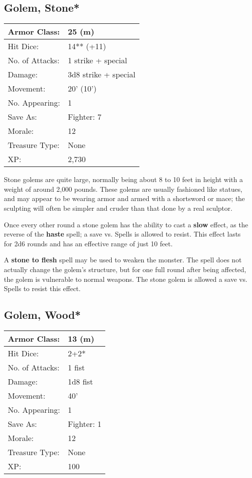 \documentclass[a4paper,twoside,openany,10pt]{book}
\begin{document}
\begin{multicols}{2}
\subsection*{Golem, Stone*}\label{golem-stone}

\begin{tabularx}{0.48\textwidth}{@{}lX@{}}
Armor Class: & 25 (m) \\\hline
Hit Dice: & 14** (+11)  \\\hline
No. of Attacks: & 1 strike + special \\\hline
Damage: & 3d8 strike + special \\\hline
Movement: & 20' (10') \\\hline
No. Appearing: & 1 \\\hline
Save As: & Fighter: 7 \\\hline
Morale: & 12 \\\hline
Treasure Type: & None \\\hline
XP: & 2,730 \\\hline
\end{tabularx}\medskip

Stone golems are quite large, normally being about 8 to 10 feet in height with a weight of around 2,000 pounds. These golems are usually fashioned like statues, and may appear to be wearing armor and armed with a shortsword or mace; the sculpting will often be simpler and cruder than that done by a real sculptor.

Once every other round a stone golem has the ability to cast a \textbf{slow} effect, as the reverse of the \textbf{haste} spell; a save vs. Spells is allowed to resist. This effect lasts for 2d6 rounds and has an effective range of just 10 feet.

A \textbf{stone to flesh }spell may be used to weaken the monster. The spell does not actually change the golem's structure, but for one full round after being affected, the golem is vulnerable to normal weapons. The stone golem is allowed a save vs. Spells to resist this effect.

\subsection*{Golem, Wood*}\label{golem-wood}

\begin{tabularx}{0.48\textwidth}{@{}lX@{}}
Armor Class: & 13 (m) \\\hline
Hit Dice: & 2+2* \\\hline
No. of Attacks: & 1 fist \\\hline
Damage: & 1d8 fist \\\hline
Movement: & 40' \\\hline
No. Appearing: & 1 \\\hline
Save As: & Fighter: 1 \\\hline
Morale: & 12 \\\hline
Treasure Type: & None \\\hline
XP: & 100 \\\hline
\end{tabularx}\medskip


\end{multicols}
\end{document}
